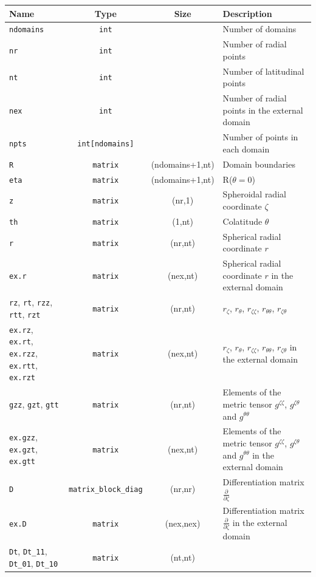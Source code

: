\noindent\begin{longtable}{p{3.7cm}ccp{5cm}}
Name&Type&Size&Description\\
\hline
\texttt{ndomains}&\texttt{int}&&Number of domains\\
\texttt{nr}&\texttt{int}&&Number of radial points\\
\texttt{nt}&\texttt{int}&&Number of latitudinal points\\
\texttt{nex}&\texttt{int}&&Number of radial points in the external domain\\
\texttt{npts}&\texttt{int[ndomains]}&&Number of points in each domain\\
\texttt{R}&\texttt{matrix}&(ndomains+1,nt)&Domain boundaries\\
\texttt{eta}&\texttt{matrix}&(ndomains+1,nt)&R($\theta=0$)\\
\texttt{z}&\texttt{matrix}&(nr,1)& Spheroidal radial coordinate $\zeta$\\
\texttt{th}&\texttt{matrix}&(1,nt)& Colatitude $\theta$\\
\texttt{r}&\texttt{matrix}&(nr,nt)& Spherical radial coordinate $r$\\
\texttt{ex.r}&\texttt{matrix}&(nex,nt)& Spherical radial coordinate $r$ in
the external domain\\
\texttt{rz}, \texttt{rt}, \texttt{rzz}, \texttt{rtt}, \texttt{rzt}
&\texttt{matrix}&(nr,nt)
& $r_\zeta$, $r_\theta$, $r_{\zeta\zeta}$, $r_{\theta\theta}$, $r_{\zeta\theta}$\\
\texttt{ex.rz}, \texttt{ex.rt}, \texttt{ex.rzz}, \texttt{ex.rtt}, \texttt{ex.rzt}
&\texttt{matrix}&(nex,nt)
& $r_\zeta$, $r_\theta$, $r_{\zeta\zeta}$, $r_{\theta\theta}$, $r_{\zeta\theta}$
in the external domain\\
\texttt{gzz}, \texttt{gzt}, \texttt{gtt}&\texttt{matrix}&(nr,nt)&
Elements of the metric tensor $g^{\zeta\zeta}$, $g^{\zeta\theta}$ and $g^{\theta\theta}$ \\
\texttt{ex.gzz}, \texttt{ex.gzt}, \texttt{ex.gtt}&\texttt{matrix}&(nex,nt)&
Elements of the metric tensor $g^{\zeta\zeta}$, $g^{\zeta\theta}$ and $g^{\theta\theta}$ 
in the external domain\\
\texttt{D}&\texttt{matrix\_block\_diag}&(nr,nr)& Differentiation matrix $\frac{\partial}{\partial\zeta}$\\
\texttt{ex.D}&\texttt{matrix}&(nex,nex)& Differentiation matrix $\frac{\partial}{\partial\zeta}$ in
the external domain\\
\texttt{Dt}, \texttt{Dt\_11}, \texttt{Dt\_01}, \texttt{Dt\_10}&\texttt{matrix}&(nt,nt)&

\end{longtable}
